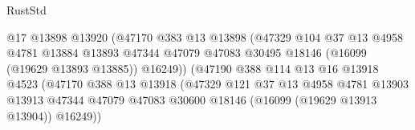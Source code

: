 \begin{lexlean}{RustStd}
\begin{coremodule}
                                            @17
                                            @13898
                                            @13920
                                            (@47170
                                              @383
                                              @13
                                              @13898
                                              (@47329
                                                @104
                                                @37
                                                @13
                                                @4958
                                                @4781
                                                @13884
                                                @13893
                                                @47344
                                                @47079
                                                @47083
                                                @30495
                                                @18146
                                                (@16099 (@19629 @13893 @13885))
                                                @16249))
                                            (@47190
                                              @388
                                              @114
                                              @13
                                              @16
                                              @13918
                                              @4523
                                              (@47170
                                                @388
                                                @13
                                                @13918
                                                (@47329
                                                  @121
                                                  @37
                                                  @13
                                                  @4958
                                                  @4781
                                                  @13903
                                                  @13913
                                                  @47344
                                                  @47079
                                                  @47083
                                                  @30600
                                                  @18146
                                                  (@16099 (@19629 @13913 @13904))
                                                  @16249))

\end{coremodule}
\end{lexlean}
